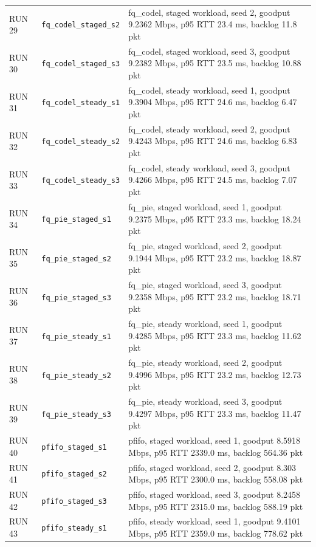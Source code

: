 \documentclass[11pt,a4paper]{article}
\begin{document}
\begin{longtable}{p{1.5cm}p{5.0cm}p{9.5cm}}
RUN 29 & \texttt{fq\_codel\_staged\_s2} & fq\_codel, staged workload, seed 2, goodput 9.2362 Mbps, p95 RTT 23.4 ms, backlog 11.8 pkt \\
RUN 30 & \texttt{fq\_codel\_staged\_s3} & fq\_codel, staged workload, seed 3, goodput 9.2382 Mbps, p95 RTT 23.5 ms, backlog 10.88 pkt \\
RUN 31 & \texttt{fq\_codel\_steady\_s1} & fq\_codel, steady workload, seed 1, goodput 9.3904 Mbps, p95 RTT 24.6 ms, backlog 6.47 pkt \\
RUN 32 & \texttt{fq\_codel\_steady\_s2} & fq\_codel, steady workload, seed 2, goodput 9.4243 Mbps, p95 RTT 24.6 ms, backlog 6.83 pkt \\
RUN 33 & \texttt{fq\_codel\_steady\_s3} & fq\_codel, steady workload, seed 3, goodput 9.4266 Mbps, p95 RTT 24.5 ms, backlog 7.07 pkt \\
RUN 34 & \texttt{fq\_pie\_staged\_s1} & fq\_pie, staged workload, seed 1, goodput 9.2375 Mbps, p95 RTT 23.3 ms, backlog 18.24 pkt \\
RUN 35 & \texttt{fq\_pie\_staged\_s2} & fq\_pie, staged workload, seed 2, goodput 9.1944 Mbps, p95 RTT 23.2 ms, backlog 18.87 pkt \\
RUN 36 & \texttt{fq\_pie\_staged\_s3} & fq\_pie, staged workload, seed 3, goodput 9.2358 Mbps, p95 RTT 23.2 ms, backlog 18.71 pkt \\
RUN 37 & \texttt{fq\_pie\_steady\_s1} & fq\_pie, steady workload, seed 1, goodput 9.4285 Mbps, p95 RTT 23.3 ms, backlog 11.62 pkt \\
RUN 38 & \texttt{fq\_pie\_steady\_s2} & fq\_pie, steady workload, seed 2, goodput 9.4996 Mbps, p95 RTT 23.2 ms, backlog 12.73 pkt \\
RUN 39 & \texttt{fq\_pie\_steady\_s3} & fq\_pie, steady workload, seed 3, goodput 9.4297 Mbps, p95 RTT 23.3 ms, backlog 11.47 pkt \\
RUN 40 & \texttt{pfifo\_staged\_s1} & pfifo, staged workload, seed 1, goodput 8.5918 Mbps, p95 RTT 2339.0 ms, backlog 564.36 pkt \\
RUN 41 & \texttt{pfifo\_staged\_s2} & pfifo, staged workload, seed 2, goodput 8.303 Mbps, p95 RTT 2300.0 ms, backlog 558.08 pkt \\
RUN 42 & \texttt{pfifo\_staged\_s3} & pfifo, staged workload, seed 3, goodput 8.2458 Mbps, p95 RTT 2315.0 ms, backlog 588.19 pkt \\
RUN 43 & \texttt{pfifo\_steady\_s1} & pfifo, steady workload, seed 1, goodput 9.4101 Mbps, p95 RTT 2359.0 ms, backlog 778.62 pkt \\

\end{longtable}
\end{document}
